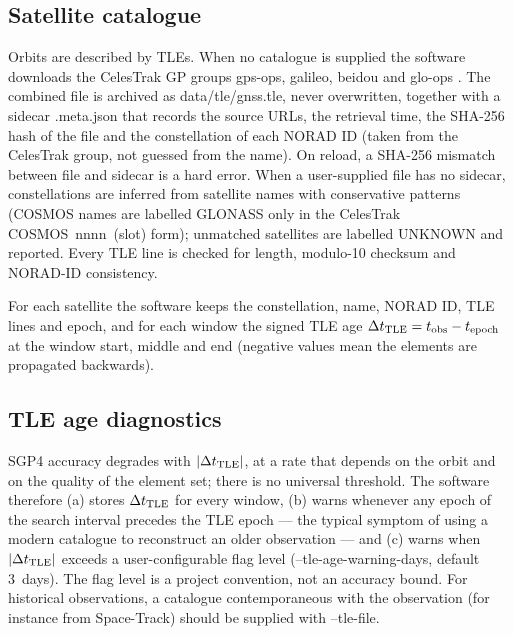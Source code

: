 \documentclass[11pt,a4paper]{article}
\newcommand{\code}[1]{{\ttfamily\def\_{\textunderscore\allowbreak}#1}}
\begin{document}
\subsection{Satellite catalogue}

Orbits are described by TLEs. When no catalogue is supplied the software
downloads the CelesTrak GP groups \code{gps-ops}, \code{galileo},
\code{beidou} and \code{glo-ops} \cite{celestrak}. The combined file is
archived as \code{data/tle/gnss\_<retrieval time>.tle}, never overwritten,
together with a sidecar \code{.meta.json} that records the source URLs, the
retrieval time, the SHA-256 hash of the file and the constellation of each
NORAD ID (taken from the CelesTrak group, not guessed from the name). On
reload, a SHA-256 mismatch between file and sidecar is a hard error. When a
user-supplied file has no sidecar, constellations are inferred from
satellite names with conservative patterns (\code{COSMOS} names are labelled
GLONASS only in the CelesTrak \code{COSMOS~nnnn~(slot)} form); unmatched
satellites are labelled \code{UNKNOWN} and reported. Every TLE line is checked
for length, modulo-10 checksum and NORAD-ID consistency.

For each satellite the software keeps the constellation, name, NORAD ID, TLE
lines and epoch, and for each window the signed TLE age
$\Delta t_{\rm TLE}=t_{\rm obs}-t_{\rm epoch}$ at the window start, middle
and end (negative values mean the elements are propagated backwards).

\subsection{TLE age diagnostics}

SGP4 accuracy degrades with $|\Delta t_{\rm TLE}|$, at a rate that depends on
the orbit and on the quality of the element set; there is no universal
threshold. The software therefore (a) stores $\Delta t_{\rm TLE}$ for every
window, (b) warns whenever any epoch of the search interval precedes the TLE
epoch --- the typical symptom of using a modern catalogue to reconstruct an
older observation --- and (c) warns when $|\Delta t_{\rm TLE}|$ exceeds a
user-configurable flag level (\code{--tle-age-warning-days}, default 3~days).
The flag level is a project convention, not an accuracy bound. For
historical observations, a catalogue contemporaneous with the observation
(for instance from Space-Track) should be supplied with \code{--tle-file}.

\end{document}
